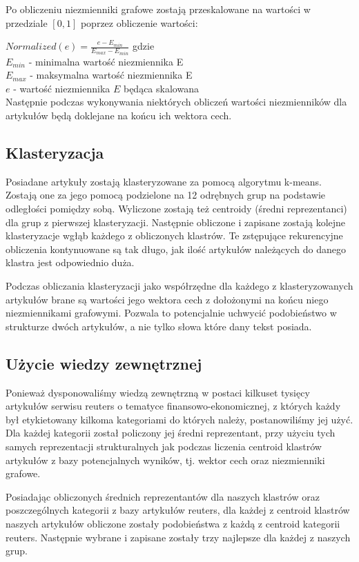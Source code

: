 Po obliczeniu niezmienniki grafowe zostają przeskalowane na wartości w przedziale $[0,1]$ poprzez obliczenie wartości:

$Normalized(e) = \frac{e - E_{min}}{E_{max} - E_{min}}$
gdzie\\
$E_{min}$ - minimalna wartość niezmiennika E\\
$E_{max}$ - maksymalna wartość niezmiennika E\\
$e$ - wartość niezmiennika $E$ będąca skalowana\\

Następnie podczas wykonywania niektórych obliczeń wartości niezmienników dla artykułów będą doklejane na końcu ich wektora cech.
 
\subsection{Klasteryzacja}
Posiadane artykuły zostają klasteryzowane za pomocą algorytmu k-means. Zostają one za jego pomocą podzielone na 12 odrębnych grup na podstawie odległości pomiędzy sobą. Wyliczone zostają też centroidy (średni reprezentanci) dla grup z pierwszej klasteryzacji. Następnie obliczone i zapisane zostają kolejne klasteryzacje wgłąb każdego z obliczonych klastrów. Te zstępujące rekurencyjne obliczenia kontynuowane są tak długo, jak ilość artykułów należących do danego klastra jest odpowiednio duża. 

Podczas obliczania klasteryzacji jako współrzędne dla każdego z klasteryzowanych artykułów brane są wartości jego wektora cech z dołożonymi na końcu niego niezmiennikami grafowymi. Pozwala to potencjalnie uchwycić podobieństwo w strukturze dwóch artykułów, a nie tylko słowa które dany tekst posiada. 

\subsection{Użycie wiedzy zewnętrznej}
Ponieważ dysponowaliśmy wiedzą zewnętrzną w postaci kilkuset tysięcy artykułów serwisu reuters o tematyce finansowo-ekonomicznej, z których każdy był etykietowany kilkoma kategoriami do których należy, postanowiliśmy jej użyć. Dla każdej kategorii został policzony jej średni reprezentant, przy użyciu tych samych reprezentacji strukturalnych jak podczas liczenia centroid klastrów artykułów z bazy potencjalnych wyników, tj. wektor cech oraz niezmienniki grafowe.

Posiadając obliczonych średnich reprezentantów dla naszych klastrów oraz poszczególnych kategorii z bazy artykułów reuters, dla każdej z centroid klastrów naszych artykułów obliczone zostały podobieństwa z każdą z centroid kategorii reuters. Następnie wybrane i zapisane zostały trzy najlepsze dla każdej z naszych grup. 

